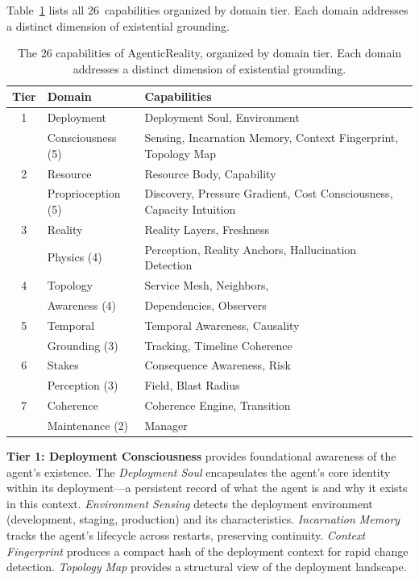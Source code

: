 \documentclass[10pt, twocolumn]{article}
\begin{document}
Table~\ref{tab:capabilities} lists all 26~capabilities organized by domain tier. Each domain addresses a distinct dimension of existential grounding.

\begin{table}[t]
\caption{The 26 capabilities of AgenticReality, organized by domain tier. Each domain addresses a distinct dimension of existential grounding.}
\label{tab:capabilities}
\centering
\scriptsize
\begin{tabular}{@{}clp{3.8cm}@{}}
\toprule
\textbf{Tier} & \textbf{Domain} & \textbf{Capabilities} \\
\midrule
1 & Deployment & Deployment Soul, Environment \\
  & Consciousness (5) & Sensing, Incarnation Memory, Context Fingerprint, Topology Map \\
\midrule
2 & Resource & Resource Body, Capability \\
  & Proprioception (5) & Discovery, Pressure Gradient, Cost Consciousness, Capacity Intuition \\
\midrule
3 & Reality & Reality Layers, Freshness \\
  & Physics (4) & Perception, Reality Anchors, Hallucination Detection \\
\midrule
4 & Topology & Service Mesh, Neighbors, \\
  & Awareness (4) & Dependencies, Observers \\
\midrule
5 & Temporal & Temporal Awareness, Causality \\
  & Grounding (3) & Tracking, Timeline Coherence \\
\midrule
6 & Stakes & Consequence Awareness, Risk \\
  & Perception (3) & Field, Blast Radius \\
\midrule
7 & Coherence & Coherence Engine, Transition \\
  & Maintenance (2) & Manager \\
\bottomrule
\end{tabular}
\end{table}

\textbf{Tier 1: Deployment Consciousness} provides foundational awareness of the agent's existence. The \emph{Deployment Soul} encapsulates the agent's core identity within its deployment---a persistent record of what the agent is and why it exists in this context. \emph{Environment Sensing} detects the deployment environment (development, staging, production) and its characteristics. \emph{Incarnation Memory} tracks the agent's lifecycle across restarts, preserving continuity. \emph{Context Fingerprint} produces a compact hash of the deployment context for rapid change detection. \emph{Topology Map} provides a structural view of the deployment landscape.
\end{document}
